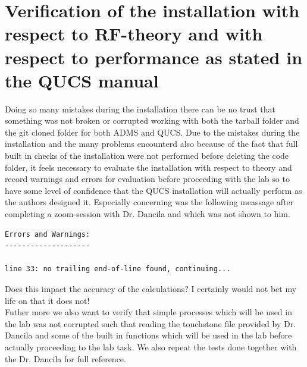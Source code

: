 \documentclass{article}
\begin{document}
\section{Verification of the installation with respect to RF-theory and with respect to performance as stated in the QUCS manual}
Doing so many mistakes during the installation there can be no trust that something was not broken or corrupted working
 with both the tarball folder and the git cloned folder for both ADMS and QUCS.
Due to the mistakes during the installation and the many problems encounterd also because of the fact that full built in checks
of the installation were not performed before deleting the code folder, it feels necessary to evaluate the installation with respect to theory
and record warnings and errors for evaluation before proceeding with the lab so to have some level of confidence
that the QUCS installation will actually perform as the authors designed it.
Especially concerning was the following meassage after completing a zoom-session with Dr. Dancila and which was not shown to him.
\begin{verbatim}
Errors and Warnings:
--------------------

line 33: no trailing end-of-line found, continuing...
\end{verbatim}
Does this impact the accuracy of the calculations?
 I certainly would not bet my life on that it does not!\\
Futher more we also want to verify that simple processes which will be used in the lab was not corrupted
such that reading the touchstone file provided by
Dr. Dancila and some of the built in functions which will be used in the lab before actually proceeding to the lab task.
We also repeat the tests done together with the Dr. Dancila for full reference.
\end{document}
